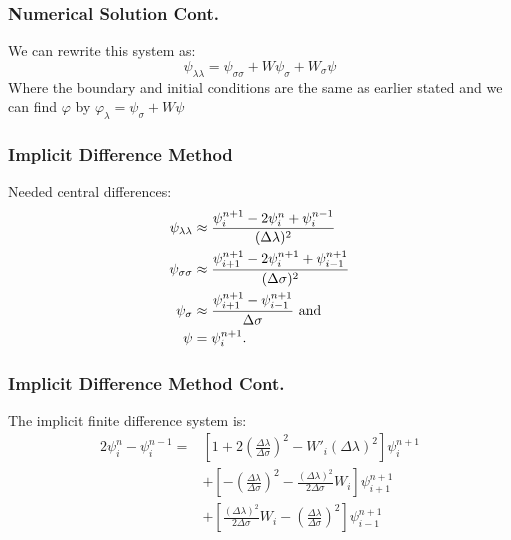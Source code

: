 \begin{frame}
\frametitle{Numerical Solution Cont.}

We can rewrite this system as:
\[
\psi_{\lambda \lambda}=\psi_{\sigma\sigma}+W\psi_{\sigma}+W_\sigma\psi
\]
Where the boundary and initial conditions are the same as earlier stated and we can find $\varphi$ by $\varphi_\lambda = \psi_\sigma+W\psi$ 
\end{frame}

\begin{frame}
\frametitle{Implicit Difference Method}
Needed central differences:\\
\begin{align*}%
\psi_{\lambda \lambda}&\approx \frac{\psi^{n+1}_i-2\psi^n_i+\psi^{n-1}_i}{(\Delta\lambda)^2}\\\vspace{3mm}
\psi_{\sigma\sigma}&\approx \frac{\psi^{n+1}_{i+1}-2\psi^{n+1}_i+\psi^{n+1}_{i-1}}{(\Delta\sigma)^2}\\\vspace{3mm}
\psi_\sigma&\approx \frac{\psi^{n+1}_{i+1}-\psi^{n+1}_{i-1}}{\Delta\sigma}\text{ and}\\\vspace{3mm}
\psi&=\psi^{n+1}_i.\\
\end{align*}
\end{frame}


\begin{frame}
\frametitle{Implicit Difference Method Cont.}
The implicit finite difference system is:
\begin{align*}
2\psi^{n}_i-\psi^{n-1}_i=&[1+2(\frac{\Delta\lambda}{\Delta\sigma})^2-W'_i(\Delta\lambda)^2]\psi^{n+1}_{i}\\
													 &+[-(\frac{\Delta\lambda}{\Delta\sigma})^2-\frac{(\Delta\lambda)^2}{2\Delta\sigma}W_i]\psi^{n+1}_{i+1}\\
													 &+[\frac{(\Delta\lambda)^2}{2\Delta\sigma} W_i-(\frac{\Delta\lambda}{\Delta\sigma})^2]\psi^{n+1}_{i-1}\\
\end{align*}
\end{frame}

